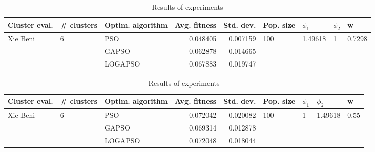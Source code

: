 \documentclass{article}
\begin{document}
\begin{table}
\centering
\caption{Results of experiments}
\begin{tabular}{lllrrllll}
\toprule
            Cluster eval. &        \# clusters & Optim. algorithm &  Avg. fitness &  Std. dev. &            Pop. size &               $\phi_{1}$ &         $\phi_{2}$ &                       w \\
\midrule
\multirow{3}{*}{Xie Beni} & \multirow{3}{*}{6} &              PSO &      0.048405 &   0.007159 & \multirow{3}{*}{100} & \multirow{3}{*}{1.49618} & \multirow{3}{*}{1} & \multirow{3}{*}{0.7298} \\
                          &                    &            GAPSO &      0.062878 &   0.014665 &                      &                          &                    &                         \\
                          &                    &          LOGAPSO &      0.067883 &   0.019747 &                      &                          &                    &                         \\
\bottomrule
\end{tabular}
\end{table}
\begin{table}
\centering
\caption{Results of experiments}
\begin{tabular}{lllrrllll}
\toprule
            Cluster eval. &        \# clusters & Optim. algorithm &  Avg. fitness &  Std. dev. &            Pop. size &         $\phi_{1}$ &               $\phi_{2}$ &                     w \\
\midrule
\multirow{3}{*}{Xie Beni} & \multirow{3}{*}{6} &              PSO &      0.072042 &   0.020082 & \multirow{3}{*}{100} & \multirow{3}{*}{1} & \multirow{3}{*}{1.49618} & \multirow{3}{*}{0.55} \\
                          &                    &            GAPSO &      0.069314 &   0.012878 &                      &                    &                          &                       \\
                          &                    &          LOGAPSO &      0.072048 &   0.018044 &                      &                    &                          &                       \\
\bottomrule
\end{tabular}
\end{table}
\end{document}
